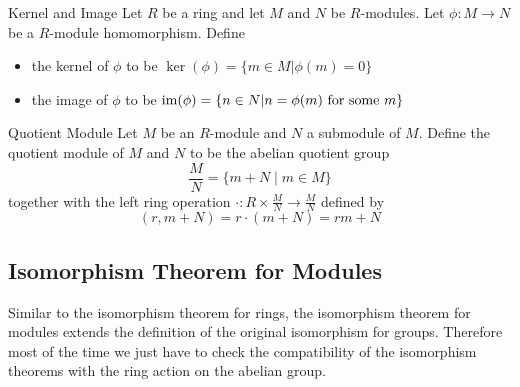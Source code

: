 \documentclass[a4paper]{article}
\begin{document}
\begin{defn}{Kernel and Image}{} Let $R$ be a ring and let $M$ and $N$ be $R$-modules. Let $\phi:M\to N$ be a $R$-module homomorphism. Define
\begin{itemize}
\item the kernel of $\phi$ to be $\ker(\phi)=\{m\in M|\phi(m)=0\}$
\item the image of $\phi$ to be $\operatorname{im}(\phi)=\{n\in N|n=\phi(m)\text{ for some }m\}$
\end{itemize}
\end{defn}

\begin{defn}{Quotient Module}{} Let $M$ be an $R$-module and $N$ a submodule of $M$. Define the quotient module of $M$ and $N$ to be the abelian quotient group $$\frac{M}{N}=\{m+N\;|\;m\in M\}$$ together with the left ring operation $\cdot:R\times\frac{M}{N}\to\frac{M}{N}$ defined by $$(r,m+N)=r\cdot(m+N)=rm+N$$
\end{defn}

\subsection{Isomorphism Theorem for Modules}
Similar to the isomorphism theorem for rings, the isomorphism theorem for modules extends the definition of the original isomorphism for groups. Therefore most of the time we just have to check the compatibility of the isomorphism theorems with the ring action on the abelian group. 
\end{document}
